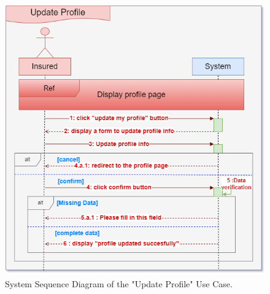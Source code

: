 \begin{figure}[h!]
    \centering
    \includegraphics[width=1\textwidth]{figures/seqUpdate_profile.png}
    \caption{System Sequence Diagram of the "Update Profile" Use Case.}
\end{figure}
\clearpage


